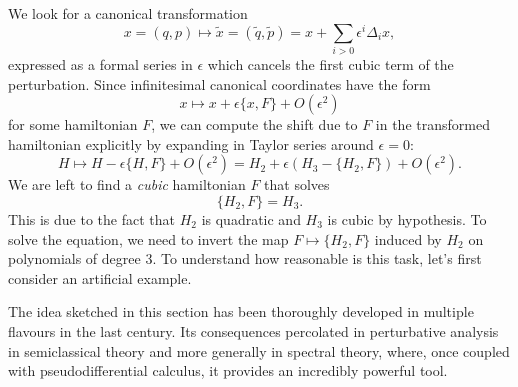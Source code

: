 \documentclass[english,fontsize=11pt,paper=b5]{scrbook}
\theoremstyle{definition}
\begin{document}
      We look for a canonical transformation
      \begin{equation}
        x = (q,p) \mapsto \widetilde x = (\widetilde q, \widetilde p) = x + \sum_{i>0} \epsilon^i \Delta_i x,
      \end{equation}
      expressed as a formal series in $\epsilon$ which cancels the first cubic term of the perturbation.
      Since infinitesimal canonical coordinates have the form
      \begin{equation}
        x \mapsto x + \epsilon\big\{x, F\big\} + O(\epsilon^2)
      \end{equation}
      for some hamiltonian $F$, we can compute the shift due to $F$ in the transformed hamiltonian explicitly by expanding in Taylor series around $\epsilon=0$:
      \begin{equation}
        H \mapsto H - \epsilon\big\{H,F\big\} + O(\epsilon^2)
        = H_2 + \epsilon \left(H_3 - \big\{H_2,F\big\}\right) + O(\epsilon^2).
      \end{equation}
      We are left to find a \emph{cubic} hamiltonian $F$ that solves
      \begin{equation}\label{eq:linearmapH_2}
        \big\{H_2,F\big\} = H_3.
      \end{equation}
      This is due to the fact that $H_2$ is quadratic and $H_3$ is cubic by hypothesis.
      To solve the equation, we need to invert the map $F \mapsto \big\{H_2,F\big\}$ induced by $H_2$ on polynomials of degree $3$.
      To understand how reasonable is this task, let's first consider an artificial example.

      The idea sketched in this section has been thoroughly developed in multiple flavours in the last century.
      Its consequences percolated in perturbative analysis in semiclassical theory and more generally in spectral theory, where, once coupled with pseudodifferential calculus, it provides an incredibly powerful tool.
\end{document}
